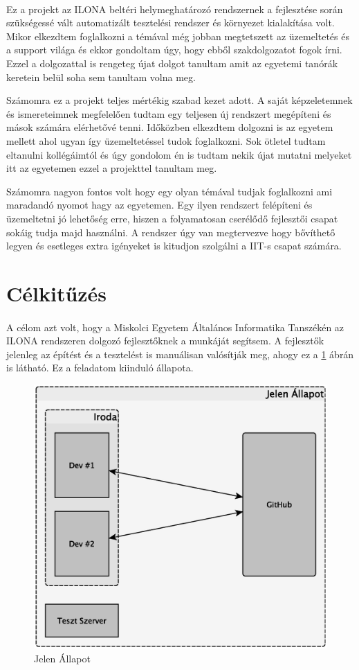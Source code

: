 \paragraph{}
Ez a projekt az ILONA beltéri helymeghatározó rendszernek a fejlesztése során szükségessé vált automatizált tesztelési rendszer és környezet kialakítása volt. 
Mikor elkezdtem foglalkozni a témával még jobban megtetszett az üzemeltetés és a support világa és ekkor gondoltam úgy, hogy ebből szakdolgozatot fogok írni. 
Ezzel a dolgozattal is rengeteg újat dolgot tanultam amit az egyetemi tanórák keretein belül soha sem tanultam volna meg. 

Számomra ez a projekt teljes mértékig szabad kezet adott.
A saját képzeletemnek és ismereteimnek megfelelően tudtam egy teljesen új rendszert megépíteni és mások számára elérhetővé tenni.
Időközben elkezdtem dolgozni is az egyetem mellett ahol ugyan így üzemeltetéssel tudok foglalkozni.
Sok ötletel tudtam eltanulni kollégáimtól és úgy gondolom én is tudtam nekik újat mutatni melyeket itt az egyetemen ezzel a projekttel tanultam meg.


Számomra nagyon fontos volt hogy egy olyan témával tudjak foglalkozni ami maradandó nyomot hagy az egyetemen.
Egy ilyen rendszert felépíteni és üzemeltetni jó lehetőség erre, hiszen a folyamatosan cserélődő fejlesztői csapat sokáig tudja majd használni.
A rendszer úgy van megtervezve hogy bővíthető legyen és esetleges extra igényeket is kitudjon szolgálni a IIT-s csapat számára.

\pagebreak
\section{Célkitűzés}
\label{chapGoal}
\paragraph{}
A célom azt volt, hogy a Miskolci Egyetem Általános Informatika Tanszékén az ILONA rendszeren dolgozó fejlesztőknek a munkáját segítsem. 
A fejlesztők jelenleg az építést és a tesztelést is manuálisan valósítják meg, ahogy ez a \ref{fig:jelenallapot} ábrán is látható. Ez a feladatom kiinduló állapota. 

\begin{figure}[h]
	\centering
	\includegraphics[width=0.7\linewidth]{figures/jelenallapot}
	\caption{Jelen Állapot}
	\label{fig:jelenallapot}
\end{figure}

